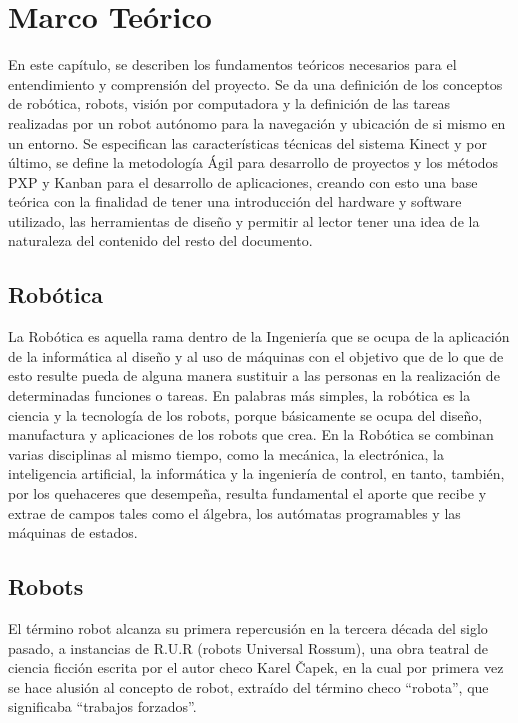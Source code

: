 \chapter{Marco Teórico}

En este capítulo, se describen los fundamentos teóricos necesarios para el entendimiento y comprensión del proyecto. Se da una definición de los conceptos de robótica, robots, visión por computadora y la definición de las tareas realizadas por un robot autónomo para la navegación y ubicación de si mismo en un entorno. Se especifican las características técnicas del sistema Kinect y por último, se define la metodología Ágil para desarrollo de proyectos y los métodos PXP y Kanban para el desarrollo de aplicaciones, creando con esto una base teórica con la finalidad de tener una introducción del hardware y software utilizado, las herramientas de diseño y permitir al lector tener una idea de la naturaleza del contenido del resto del documento.

\section{Robótica}
La Robótica es aquella rama dentro de la Ingeniería que se ocupa de la aplicación de la informática al diseño y al uso de máquinas con el objetivo que de lo que de esto resulte pueda de alguna manera sustituir a las personas en la realización de determinadas funciones o tareas.
En palabras más simples, la robótica es la ciencia y la tecnología de los robots, porque básicamente se ocupa del diseño, manufactura y aplicaciones de los robots que crea. En la Robótica se combinan varias disciplinas al mismo tiempo, como la mecánica, la electrónica, la inteligencia artificial, la informática y la ingeniería de control, en tanto, también, por los quehaceres que desempeña, resulta fundamental el aporte que recibe y extrae de campos tales como el álgebra, los autómatas programables y las máquinas de estados.

\section{Robots}
El término robot alcanza su primera repercusión en la tercera década del siglo pasado, a instancias de R.U.R (robots Universal Rossum), una obra teatral de ciencia ficción escrita por el autor checo Karel Čapek, en la cual por primera vez se hace alusión al concepto de robot, extraído del término checo ``robota'', que significaba ``trabajos forzados''.

